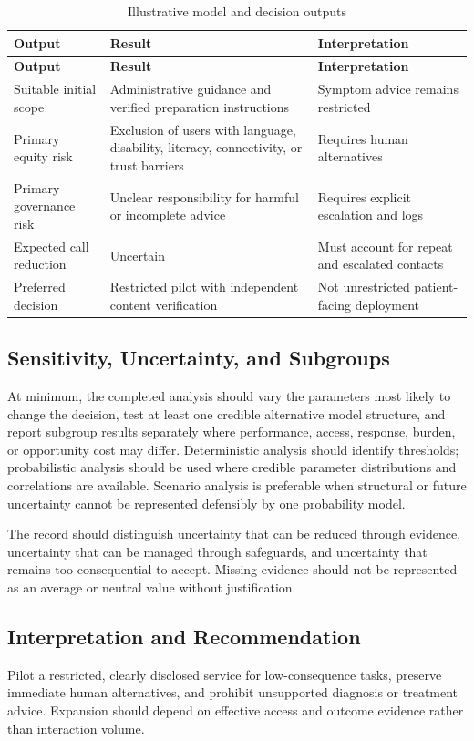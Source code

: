 \begin{longtable}{@{}p{}p{}p{}@{}}
\caption{Illustrative model and decision outputs}
\label{tab:comp-ch10-outputs}\\
\toprule
\textbf{Output} & \textbf{Result} & \textbf{Interpretation} \\
\midrule
\endfirsthead
\toprule
\textbf{Output} & \textbf{Result} & \textbf{Interpretation} \\
\midrule
\endhead
\bottomrule
\endlastfoot
Suitable initial scope & Administrative guidance and verified preparation instructions & Symptom advice remains restricted \\
Primary equity risk & Exclusion of users with language, disability, literacy, connectivity, or trust barriers & Requires human alternatives \\
Primary governance risk & Unclear responsibility for harmful or incomplete advice & Requires explicit escalation and logs \\
Expected call reduction & Uncertain & Must account for repeat and escalated contacts \\
Preferred decision & Restricted pilot with independent content verification & Not unrestricted patient-facing deployment \\
\end{longtable}

\subsection{Sensitivity, Uncertainty, and Subgroups}
At minimum, the completed analysis should vary the parameters most likely to
change the decision, test at least one credible alternative model structure, and
report subgroup results separately where performance, access, response, burden,
or opportunity cost may differ. Deterministic analysis should identify thresholds;
probabilistic analysis should be used where credible parameter distributions and
correlations are available. Scenario analysis is preferable when structural or
future uncertainty cannot be represented defensibly by one probability model.

The record should distinguish uncertainty that can be reduced through evidence,
uncertainty that can be managed through safeguards, and uncertainty that remains
too consequential to accept. Missing evidence should not be represented as an
average or neutral value without justification.

\subsection{Interpretation and Recommendation}
Pilot a restricted, clearly disclosed service for low-consequence tasks, preserve immediate human alternatives, and prohibit unsupported diagnosis or treatment advice. Expansion should depend on effective access and outcome evidence rather than interaction volume.

